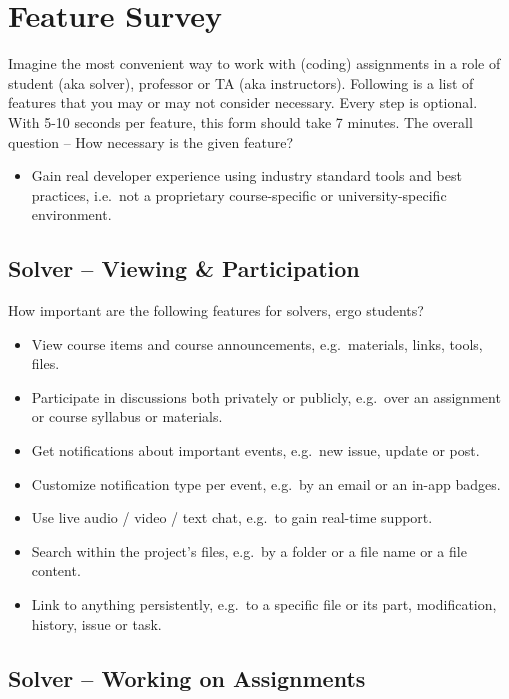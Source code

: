 \chapter{Feature Survey} \label{app:survey}

Imagine the most convenient way to work with (coding) assignments in a role of student (aka solver), professor or TA (aka instructors). Following is a list of features that you may or may not consider necessary. Every step is optional. With 5-10 seconds per feature, this form should take 7 minutes. The overall question -- How necessary is the given feature?

\begin{itemize}
\item
  Gain real developer experience using industry standard tools and best practices, i.e.~not a proprietary course-specific or university-specific environment.
\end{itemize}

\section{Solver -- Viewing \& Participation}\label{sec:solver-viewing-participation}

How important are the following features for solvers, ergo students?

\begin{itemize}
\item
  View course items and course announcements, e.g.~materials, links, tools, files.
\item
  Participate in discussions both privately or publicly, e.g.~over an assignment or course syllabus or materials.
\item
  Get notifications about important events, e.g.~new issue, update or post.
\item
  Customize notification type per event, e.g.~by an email or an in-app badges.
\item
  Use live audio / video / text chat, e.g.~to gain real-time support.
\item
  Search within the project's files, e.g.~by a folder or a file name or a file content.
\item
  Link to anything persistently, e.g.~to a specific file or its part, modification, history, issue or task.
\end{itemize}

\section{Solver -- Working on Assignments}\label{sec:solver-working-on-assignments}

